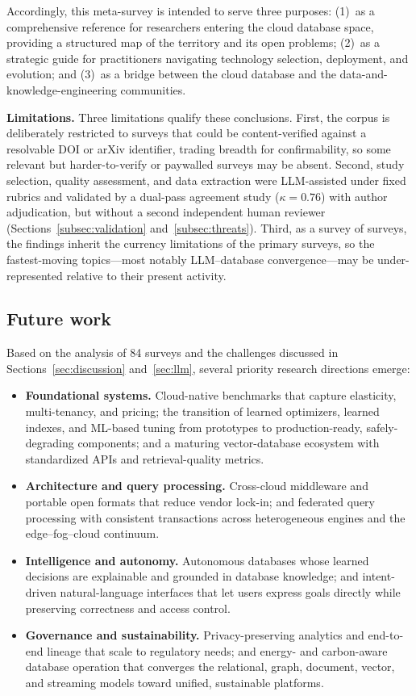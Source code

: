 \documentclass[a4paper,fleqn]{cas-sc}
\begin{document}
Accordingly, this meta-survey is intended to serve three purposes: (1)~as a comprehensive reference for researchers entering the cloud database space, providing a structured map of the territory and its open problems; (2)~as a strategic guide for practitioners navigating technology selection, deployment, and evolution; and (3)~as a bridge between the cloud database and the data-and-knowledge-engineering communities.

\textbf{Limitations.} Three limitations qualify these conclusions. First, the corpus is deliberately restricted to surveys that could be content-verified against a resolvable DOI or arXiv identifier, trading breadth for confirmability, so some relevant but harder-to-verify or paywalled surveys may be absent. Second, study selection, quality assessment, and data extraction were LLM-assisted under fixed rubrics and validated by a dual-pass agreement study ($\kappa = 0.76$) with author adjudication, but without a second independent human reviewer (Sections~\ref{subsec:validation} and~\ref{subsec:threats}). Third, as a survey of surveys, the findings inherit the currency limitations of the primary surveys, so the fastest-moving topics---most notably LLM--database convergence---may be under-represented relative to their present activity.

\subsection*{Future work}
\label{subsec:futurework}

Based on the analysis of 84 surveys and the challenges discussed in Sections~\ref{sec:discussion} and~\ref{sec:llm}, several priority research directions emerge:
\begin{itemize}
  \item \textbf{Foundational systems.} Cloud-native benchmarks that capture elasticity, multi-tenancy, and pricing; the transition of learned optimizers, learned indexes, and ML-based tuning from prototypes to production-ready, safely-degrading components; and a maturing vector-database ecosystem with standardized APIs and retrieval-quality metrics.
  \item \textbf{Architecture and query processing.} Cross-cloud middleware and portable open formats that reduce vendor lock-in; and federated query processing with consistent transactions across heterogeneous engines and the edge--fog--cloud continuum.
  \item \textbf{Intelligence and autonomy.} Autonomous databases whose learned decisions are explainable and grounded in database knowledge; and intent-driven natural-language interfaces that let users express goals directly while preserving correctness and access control.
  \item \textbf{Governance and sustainability.} Privacy-preserving analytics and end-to-end lineage that scale to regulatory needs; and energy- and carbon-aware database operation that converges the relational, graph, document, vector, and streaming models toward unified, sustainable platforms.
\end{itemize}
\end{document}
